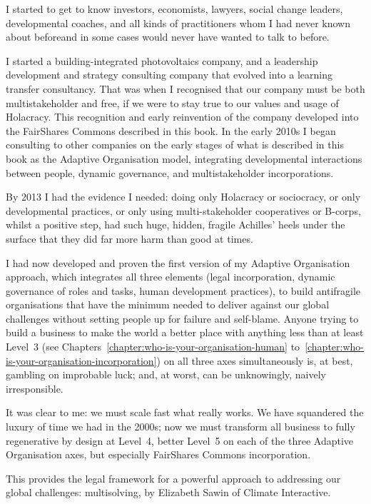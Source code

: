 I started to get to know investors, economists, lawyers, social change leaders, developmental coaches, and all kinds of practitioners whom I had never known about before\textemdash and in some cases would never have wanted to talk to before.


I started a building-integrated photovoltaics company, and a leadership development and strategy consulting company that evolved into a learning transfer consultancy. That was when I recognised that our company must be both multistakeholder and free, if we were to stay true to our values and usage of Holacracy. This recognition and early reinvention of the company developed into the FairShares Commons described in this book. In the early 2010s I began consulting to other companies on the early stages of what is described in this book as the Adaptive Organisation model, integrating developmental interactions between people, dynamic governance, and multistakeholder incorporations.


By 2013 I had the evidence I needed: doing only Holacracy or sociocracy, or only developmental practices, or only using multi-stakeholder cooperatives or B-corps, whilst a positive step, had such  huge, hidden, fragile Achilles’ heels under the surface that they did far more harm than good at times. 


I had now developed and proven the first version of my Adaptive Organisation approach, which integrates all three elements (legal incorporation, dynamic governance of roles and tasks, human development practices), to build antifragile organisations that have the minimum needed to deliver against our global challenges without setting people up for failure and self-blame. Anyone trying to build a business to make the world a better place with anything less than at least Level~3 (see Chapters~\ref{chapter:who-is-your-organisation-human} to~\ref{chapter:who-is-your-organisation-incorporation}) on all three axes simultaneously is, at best, gambling on improbable luck; and, at worst, can be unknowingly, naively irresponsible. 


It was clear to me: we must scale fast what really works. We have squandered the luxury of time we had in the 2000s; now we must transform all business to fully regenerative by design at Level~4, better Level~5 on each of the three Adaptive Organisation axes, but especially FairShares Commons incorporation. 


This provides the legal framework for a powerful approach to addressing our global challenges: multisolving\cite{sawin-multisolving}, by Elizabeth Sawin of Climate Interactive. 


